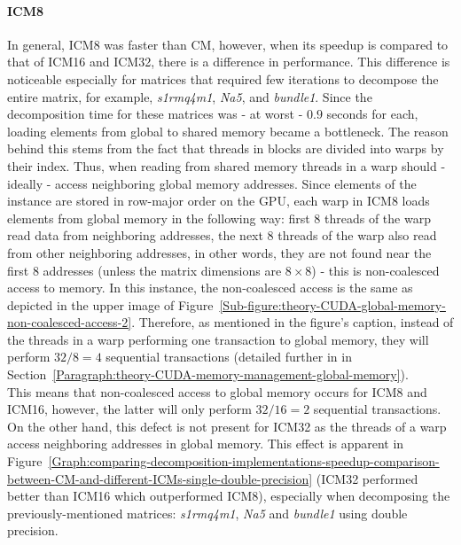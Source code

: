 \paragraph{ICM8} In general, ICM8 was faster than CM, however, when its speedup is compared to that of ICM16 and ICM32, there is a difference in performance. This difference is noticeable especially for matrices that required few iterations to decompose the entire matrix, for example, \textit{s1rmq4m1}, \textit{Na5}, and \textit{bundle1}. Since the decomposition time for these matrices was - at worst - $ 0.9 $ seconds for each, loading elements from global to shared memory became a bottleneck. The reason behind this stems from the fact that threads in blocks are divided into warps by their  index. Thus, when reading from shared memory threads in a warp should - ideally - access neighboring global memory addresses. Since elements of the  instance are stored in row-major order on the GPU, each warp in ICM8 loads elements from global memory in the following way: first 8 threads of the warp read data from neighboring addresses, the next 8 threads of the warp also read from other neighboring addresses, in other words, they are not found near the first 8 addresses (unless the matrix dimensions are $ 8\times 8 $) - this is non-coalesced access to memory. In this instance, the non-coalesced access is the same as depicted in the upper image of Figure~\ref{Sub-figure:theory-CUDA-global-memory-non-coalesced-access-2}. Therefore, as mentioned in the figure's caption, instead of the threads in a warp performing one transaction to global memory, they will perform $ 32/8 = 4 $ sequential transactions (detailed further in \textit{} in Section~\ref{Paragraph:theory-CUDA-memory-management-global-memory}). \\
This means that non-coalesced access to global memory occurs for ICM8 and ICM16, however, the latter will only perform $ 32/16 = 2 $ sequential transactions. On the other hand, this defect is not present for ICM32 as the threads of a warp access  neighboring addresses in global memory. This effect is apparent in Figure~\ref{Graph:comparing-decomposition-implementations-speedup-comparison-between-CM-and-different-ICMs-single-double-precision} (ICM32 performed better than ICM16 which outperformed ICM8), especially when decomposing the previously-mentioned matrices: \textit{s1rmq4m1}, \textit{Na5} and \textit{bundle1} using double precision.
